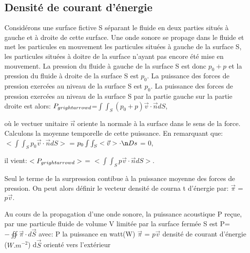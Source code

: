 \documentclass[a4paper, 12pt]{article}
\begin{document}
\subsection{Densité de courant d'énergie}
\begin{text}
Considérons une surface fictive S séparant le fluide en deux parties situés à gauche et à droite de cette surface. Une onde sonore se propage dans le fluide et met les particules en mouvement les particules situées à gauche de la surface S, les particules situées à  doitre de la surface n'ayant pas encore été mise en mouvement. La pression du fluide à gauche de la surface S est donc $p_{0}+p$ et la pression du fluide à droite de la surface S est $p_{0} $. La puissance des forces de pression exercées au niveau de la surface S est $p_{0}$. La puissance des forces de pression exercées au niveau de la surface S par la partie gauche sur la partie droite est alors:\newline 
$P_{g\\rightarrow d}$=$\int\int_{S}(p_{0}+p)\vec v \cdot \vec n dS$,\newline

où le vectuer unitaire $\vec n$ oriente la normale à la surface dans le sens de la force. Calculons la moyenne temporelle de cette puissance. En remarquant que:\newline 
$<\int\int_{S}p_{0}\vec v \cdot \vec n dS>$ = $p_{0}\int\int_{S}<\vec v>\cdot \n Ds$ = 0,\newline

il vient:\newline 
$<P_{g\\rightarrow d}>$ = $<\int\int_{S}p\vec v \cdot \vec n dS>$.\newline 

Seul le terme de la surpression contibue à la puissance moyenne des forces de pression. On peut alors définir le vecteur densité de courna t d'énergie par:\newline 
$\vec \pi$ = $p\vec v$.\newline

Au cours de la propagation d'une onde sonore, la puissance acoustique P reçue, par une particule fluide de volume V limitée par la surface fermée S est\newline 
P=$-\oiint\vec \pi\cdot d\vec S$\newline 
avec:\newline 
P la puissance en watt(W)\newline 
$\vec \pi$ = $p \vec v$ densité de courant d'énergie ($W.m^{-2}$)\newline
d$\vec S$ orienté vers l'extérieur
\end{text}
\end{document}
